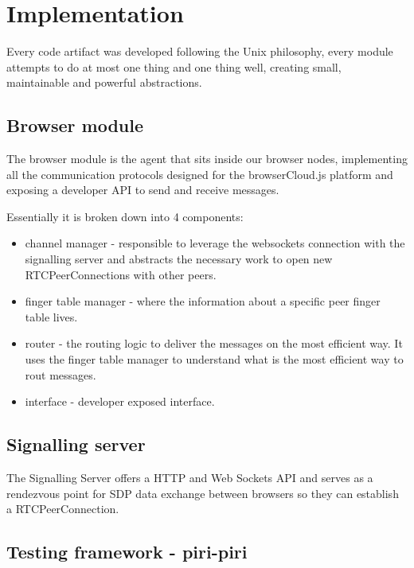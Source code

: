 
\section{Implementation}

Every code artifact was developed following the Unix philosophy, every module attempts to do at most one thing and one thing well, creating small, maintainable and powerful abstractions.

\subsection{Browser module}

The browser module is the agent that sits inside our browser nodes, implementing all the communication protocols designed for the browserCloud.js platform and exposing a developer API to send and receive messages.

Essentially it is broken down into 4 components:

\begin{itemize}
    \item channel manager - responsible to leverage the websockets connection with the signalling server and abstracts the necessary work to open new RTCPeerConnections with other peers.
    \item finger table manager - where the information about a specific peer finger table lives.
    \item router - the routing logic to deliver the messages on the most efficient way. It uses the finger table manager to understand what is the most efficient way to rout messages.
    \item interface - developer exposed interface.
\end{itemize}

\subsection{Signalling server}

The Signalling Server offers a HTTP and Web Sockets API and serves as a rendezvous point for SDP data exchange between browsers so they can establish a RTCPeerConnection. 

\subsection{Testing framework - piri-piri}

